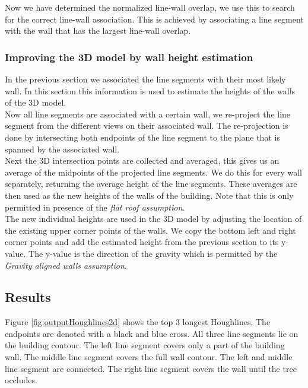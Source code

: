 	Now we have determined the normalized line-wall overlap, we use this to
	search for the correct line-wall association. This is achieved by
	associating a line segment with the wall that has the largest line-wall
	overlap.\\

\subsubsection{Improving the 3D model by wall height estimation}
	In the previous section we associated the line segments with their most
	likely wall. In this section this information is used to estimate the
	heights of the walls of the 3D model. \\
	Now all line segments are associated with a certain wall, we re-project the
	line segment from the different views on their associated wall. The
	re-projection is done by intersecting both endpoints of the line segment to
	the plane that is spanned by the associated wall.\\
	Next the 3D intersection points are collected and averaged, this gives us
	an average of the midpoints of the projected line segments. We do this for
	every wall separately, returning the average height of the line segments.
	These averages are then used as the new heights of the walls of the
	building.  Note that this is only permitted in presence of the \emph{flat roof assumption}.\\
	The new individual heights are used in the 3D model by adjusting the
	location of the existing upper corner points of the walls. We copy the
	bottom left and right corner points and add the estimated height from the
	previous section to its y-value. The y-value is the direction of the
	gravity which is permitted by the \emph{Gravity aligned walls assumption}.

\newpage
\subsection{Results}
\label{sec:ResultImprove}
\clearpage
{}
Figure \ref{fig:outputHoughlines2d} shows the top 3 longest Houghlines. The
endpoints are denoted with a black and blue cross. All three line segments lie on the
building contour.  The left line segment covers only a part of the building wall. The
middle line segment covers the full wall contour. The left and middle line segment are connected. The
right line segment covers the wall until the tree occludes.\\


